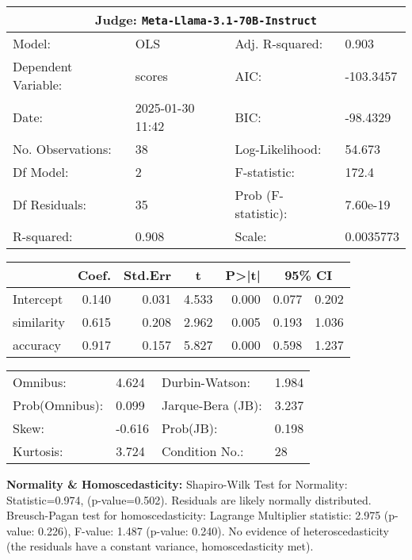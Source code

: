 \begin{center}
\small
\begin{tabular}{llll}
\toprule
\multicolumn{4}{c}{\textbf{Judge:} \texttt{Meta-Llama-3.1-70B-Instruct} \citep{grattafiori2024llama3herdmodels}} \\
\midrule
Model: & OLS & Adj. R-squared: & 0.903 \\
Dependent Variable: & scores & AIC: & -103.3457 \\
Date: & 2025-01-30 11:42 & BIC: & -98.4329 \\
No. Observations: & 38 & Log-Likelihood: & 54.673 \\
Df Model: & 2 & F-statistic: & 172.4 \\
Df Residuals: & 35 & Prob (F-statistic): & 7.60e-19 \\
R-squared: & 0.908 & Scale: & 0.0035773 \\
\bottomrule
\end{tabular}

\vspace{5pt}
\begin{tabular}{lrrrrrr}
\toprule
 & \multicolumn{1}{c}{Coef.} & \multicolumn{1}{c}{Std.Err} & \multicolumn{1}{c}{t} & \multicolumn{1}{c}{P>|t|} & \multicolumn{2}{c}{95\% CI} \\
\midrule
Intercept & 0.140 & 0.031 & 4.533 & 0.000 & 0.077 & 0.202 \\
similarity & 0.615 & 0.208 & 2.962 & 0.005 & 0.193 & 1.036 \\
accuracy & 0.917 & 0.157 & 5.827 & 0.000 & 0.598 & 1.237 \\
\bottomrule
\end{tabular}

\vspace{5pt}
\begin{tabular}{@{}ll@{\hspace{15pt}}ll@{}}
\toprule
Omnibus: & 4.624 & Durbin-Watson: & 1.984 \\
Prob(Omnibus): & 0.099 & Jarque-Bera (JB): & 3.237 \\
Skew: & -0.616 & Prob(JB): & 0.198 \\
Kurtosis: & 3.724 & Condition No.: & 28 \\
\bottomrule
\end{tabular}
\end{center}

\textbf{Normality \& Homoscedasticity:} Shapiro-Wilk Test for Normality: Statistic=0.974, (p-value=0.502).
Residuals are likely normally distributed.
Breusch-Pagan test for homoscedasticity:
Lagrange Multiplier statistic: 2.975
(p-value: 0.226), 
F-value: 1.487
(p-value: 0.240). 
No evidence of heteroscedasticity (the residuals have a constant variance, homoscedasticity met).

